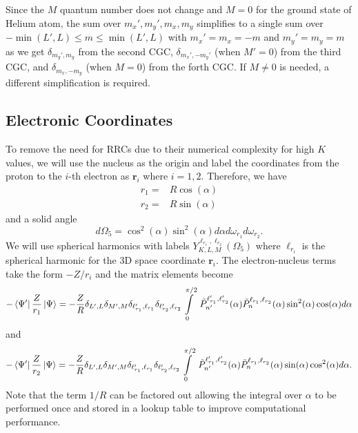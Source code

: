 Since the $M$ quantum number does not change and $M=0$ for the ground state of Helium atom, the sum over $m_x',m_y',m_x,m_y$ simplifies to a single sum over $-\min(L',L)\le m \le \min(L',L)$ with $m_x'=m_x=-m$ and $m_y'=m_y=m$ as we get $\delta_{m_y',m_y}$ from the second CGC, $\delta_{m_x',-m_y'}$ (when $M'=0$) from the third CGC, and $\delta_{m_x,-m_y}$ (when $M=0$) from the forth CGC. If $M\ne0$ is needed, a different simplification is required.


\subsection{Electronic Coordinates} %
\label{sub:electronic_coordinates}
To remove the need for RRCs due to their numerical complexity for high $K$ values, we will use the nucleus as the origin and label the coordinates from the proton to the $i$-th electron as $\mathbf{r}_i$ where $i=1,2$. Therefore, we have
\begin{align}
r_1 =& R \cos(\alpha)\\
r_2 =& R \sin(\alpha)
\end{align}
and a solid angle 
\begin{equation}
  d\Omega_5 = \cos^2(\alpha)  \sin^2(\alpha) d\alpha d\omega_{r_1} d\omega_{r_2}.
\end{equation}
We will use spherical harmonics with labels $Y_{K,L,M}^{\ell_{r_1},\ell_{r_2}}(\Omega_5)$ where $\ell_{r_i}$ is the spherical harmonic for the 3D space coordinate $\mathbf{r}_i$. The electron-nucleus terms take the form $-Z/r_i$ and the  matrix elements become
\begin{equation}
  -\bra{\Psi'}\frac{Z}{r_1}\ket{\Psi} = -\frac{Z}{R}\delta_{L',L}\delta_{M',M}\delta_{\ell_{r_1}',\ell_{r_1}}\delta_{\ell_{r_2}',\ell_{r_2}} \int\limits_0^{\pi/2}\ \tilde{P}^{\ell_{r_1}',\ell_{r_2}'}_{n'}(\alpha) \tilde{P}^{\ell_{r_1},\ell_{r_2}}_{n}(\alpha) \sin^2(\alpha) \cos(\alpha)d\alpha
\end{equation}
and 
\begin{equation}
  -\bra{\Psi'}\frac{Z}{r_2}\ket{\Psi} = -\frac{Z}{R}\delta_{L',L}\delta_{M',M}\delta_{\ell_{r_1}',\ell_{r_1}}\delta_{\ell_{r_2}',\ell_{r_2}} \int\limits_0^{\pi/2}\ \tilde{P}^{\ell_{r_1}',\ell_{r_2}'}_{n'}(\alpha) \tilde{P}^{\ell_{r_1},\ell_{r_2}}_{n}(\alpha) \sin(\alpha) \cos^2(\alpha)d\alpha.
\end{equation}
Note that the term $1/R$ can be factored out allowing the integral over $\alpha$ to be performed once and stored in a lookup table to improve computational performance.

